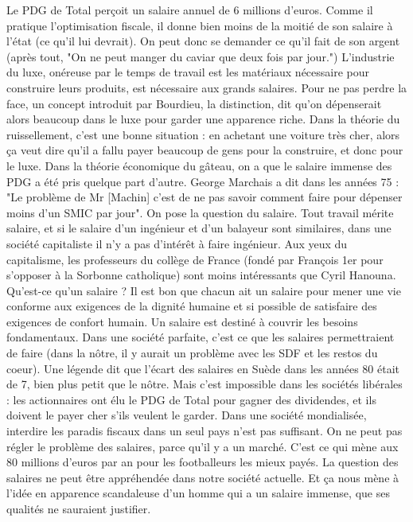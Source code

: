 \documentclass[a4paper,12pt]{book}
\begin{document}
\par Le PDG de Total perçoit un salaire annuel de 6 millions d'euros. Comme il pratique l'optimisation fiscale, il donne bien moins de la moitié de son salaire à l'état (ce qu'il lui devrait). On peut donc se demander ce qu'il fait de son argent (après tout, "On ne peut manger du caviar que deux fois par jour.") L'industrie du luxe, onéreuse par le temps de travail est les matériaux nécessaire pour construire leurs produits, est nécessaire aux grands salaires. Pour ne pas perdre la face, un concept introduit par Bourdieu, la distinction, dit qu'on dépenserait alors beaucoup dans le luxe pour garder une apparence riche. Dans la théorie du ruissellement, c'est une bonne situation : en achetant une voiture très cher, alors ça veut dire qu'il a fallu payer beaucoup de gens pour la construire, et donc pour le luxe. Dans la théorie économique du gâteau, on a que le salaire immense des PDG a été pris quelque part d'autre. George Marchais a dit dans les années 75 : "Le problème de Mr [Machin] c'est de ne pas savoir comment faire pour dépenser moins d'un SMIC par jour". On pose la question du salaire. Tout travail mérite salaire, et si le salaire d'un ingénieur et d'un balayeur sont similaires, dans une société capitaliste il n'y a pas d'intérêt à faire ingénieur. Aux yeux du capitalisme, les professeurs du collège de France (fondé par François 1er pour s'opposer à la Sorbonne catholique) sont moins intéressants que Cyril Hanouna. Qu'est-ce qu'un salaire ? Il est bon que chacun ait un salaire pour mener une vie conforme aux exigences de la dignité humaine et si possible de satisfaire des exigences de confort humain. Un salaire est destiné à couvrir les besoins fondamentaux. Dans une société parfaite, c'est ce que les salaires permettraient de faire (dans la nôtre, il y aurait un problème avec les SDF et les restos du coeur). Une légende dit que l'écart des salaires en Suède dans les années 80 était de 7, bien plus petit que le nôtre. Mais c'est impossible dans les sociétés libérales : les actionnaires ont élu le PDG de Total pour gagner des dividendes, et ils doivent le payer cher s'ils veulent le garder. Dans une société mondialisée, interdire les paradis fiscaux dans un seul pays n'est pas suffisant. On ne peut pas régler le problème des salaires, parce qu'il y a un marché. C'est ce qui mène aux 80 millions d'euros par an pour les footballeurs les mieux payés. La question des salaires ne peut être appréhendée dans notre société actuelle. Et ça nous mène à l'idée en apparence scandaleuse d'un homme qui a un salaire immense, que ses qualités ne sauraient justifier.
\end{document}
